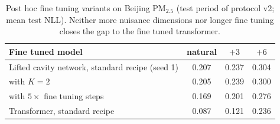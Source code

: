 \begin{table}[t]
\centering\small
\caption{\label{tab:explore}Post hoc fine tuning variants on Beijing PM$_{2.5}$ (test period of protocol v2; mean test NLL). Neither more nuisance dimensions nor longer fine tuning closes the gap to the fine tuned transformer.}
\begin{tabular}{lccc}
\toprule
Fine tuned model & natural & $+3$ & $+6$\\
\midrule
Lifted cavity network, standard recipe (seed 1) & 0.207 & 0.237 & 0.304\\
\quad with $K=2$ & 0.205 & 0.239 & 0.300\\
\quad with $5\times$ fine tuning steps & 0.169 & 0.201 & 0.276\\
Transformer, standard recipe & 0.087 & 0.121 & 0.236\\
\bottomrule
\end{tabular}
\end{table}
